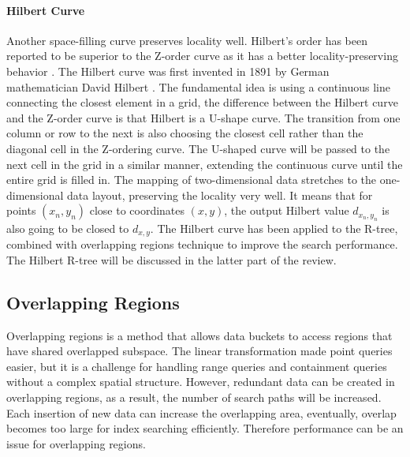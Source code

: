 \paragraph{Hilbert Curve}
Another space-filling curve preserves locality well. Hilbert's order has been reported to be superior to the  Z-order curve as it has a better locality-preserving behavior \cite{Faloutsos:1991ue}. The Hilbert curve was first invented in 1891 by German mathematician David Hilbert \cite{hilbert1935stetige}. The fundamental idea is using a continuous line connecting the closest element in a grid, the difference between the Hilbert curve and the Z-order curve is that Hilbert is a U-shape curve. The transition from one column or row to the next is also choosing the closest cell rather than the diagonal cell in the Z-ordering curve. The U-shaped curve will be passed to the next cell in the grid in a similar manner, extending the continuous curve until the entire grid is filled in. The mapping of two-dimensional data stretches to the one-dimensional data layout, preserving the locality very well. It means that for points ${(x_n, y_n)}$ close to coordinates ${(x, y)}$, the output Hilbert value ${d_{x_n, y_n}}$ is also going to be closed to ${d_{x,y}}$. The Hilbert curve has been applied to the R-tree, combined with overlapping regions technique to improve the search performance. The Hilbert R-tree will be discussed in the latter part of the review. 



\subsection{Overlapping Regions}
Overlapping regions is a method that allows data buckets to access regions that have shared overlapped subspace. The linear transformation made point queries easier, but it is a challenge for handling range queries and containment queries without a complex spatial structure. However, redundant data can be created in overlapping regions, as a result, the number of search paths will be increased. Each insertion of new data can increase the overlapping area, eventually, overlap becomes too large for index searching efficiently. Therefore performance can be an issue for overlapping regions.

